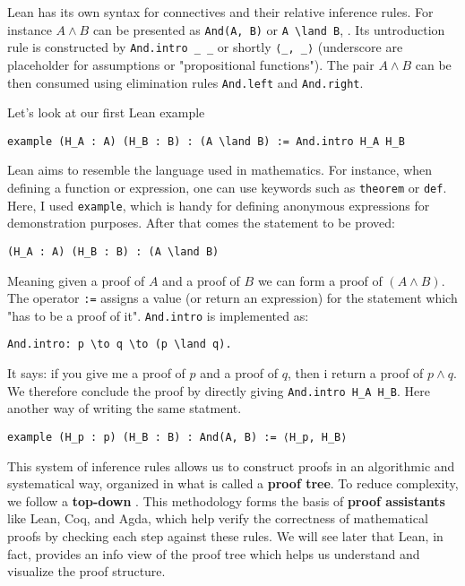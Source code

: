 Lean has its own syntax for connectives and their relative inference rules.
For instance $A \land B$ can be presented as \lstinline[language=lean]|And(A, B)| or \lstinline[language=lean]|A \land B|,
. Its untroduction rule is constructed by
\lstinline[language=lean]|And.intro _ _| or shortly
\lstinline[language=lean]|⟨_, _⟩| (underscore are placeholder for assumptions or "propositional functions").
The pair $A \land B$ can be then consumed using elimination
rules \lstinline[language=lean]|And.left| and \lstinline[language=lean]|And.right|.
\begin{example}\label{ex:conj_intro_2}
  Let's look at our first Lean example
  \begin{lstlisting}[language=lean]
    example (H_A : A) (H_B : B) : (A \land B) := And.intro H_A H_B
  \end{lstlisting}
  Lean aims to resemble the language used in mathematics.
  For instance, when defining a function or expression, one can use keywords such as
  \lstinline[language=lean]|theorem| or \lstinline[language=lean]|def|.
  Here, I used \lstinline[language=lean]|example|, which is handy for defining anonymous expressions
  for demonstration purposes.
  After that comes the statement to be proved:
  \begin{lstlisting}[language=lean]
  (H_A : A) (H_B : B) : (A \land B) 
\end{lstlisting}
  Meaning given a proof of $A$ and a proof of $B$ we can form a proof of $(A \land B)$.
  The operator \lstinline[language=lean]|:=| assigns a value (or return an expression) for the statement which
  "has to be a proof of it".
  \lstinline[language=lean]|And.intro| is implemented as:
  \begin{lstlisting}[language=lean]
  And.intro: p \to q \to (p \land q).
\end{lstlisting}
  It says: if you give me a proof of $p$ and a proof of $q$,
  then i return a proof of $p \land q$.
  We therefore conclude the proof by directly giving
  \lstinline[language=lean]|And.intro H_A H_B|.
  Here another way of writing the same statment.
  \begin{lstlisting}[language=lean]
  example (H_p : p) (H_B : B) : And(A, B) := ⟨H_p, H_B⟩
\end{lstlisting}
\end{example}

This system of inference rules allows us to construct proofs in an
algorithmic and systematical way, organized in what is called a \textbf{proof tree}.
To reduce complexity, we follow a
\textbf{top-down}
.
This methodology forms the basis of \textbf{proof assistants} like Lean,
Coq, and Agda, which help
verify the correctness of mathematical proofs by checking each step
against these rules.
We will see later that Lean, in fact, provides an info view of the proof tree
which helps us
understand and visualize
the proof structure.


